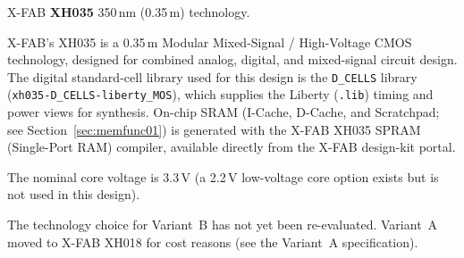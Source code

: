 X-FAB \textbf{XH035} 350\,nm (0.35\,\textmu m) technology.

X-FAB's XH035 is a 0.35\,\textmu m Modular Mixed-Signal / High-Voltage CMOS technology,
designed for combined analog, digital, and mixed-signal circuit design.
The digital standard-cell library used for this design is the \texttt{D\_CELLS} library
(\texttt{xh035-D\_CELLS-liberty\_MOS}), which supplies the Liberty (\texttt{.lib}) timing
and power views for synthesis.
On-chip SRAM (I-Cache, D-Cache, and Scratchpad; see Section~\ref{sec:memfunc01}) is generated
with the X-FAB XH035 SPRAM (Single-Port RAM) compiler, available directly from the
X-FAB design-kit portal.

The nominal core voltage is 3.3\,V (a 2.2\,V low-voltage core option exists but is not used
in this design).

The technology choice for Variant~B has not yet been re-evaluated. Variant~A
moved to X-FAB XH018 for cost reasons (see the Variant~A specification).
